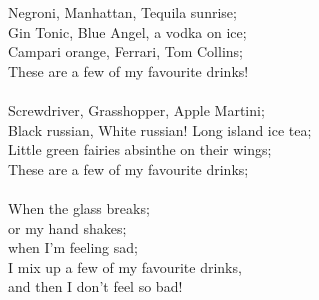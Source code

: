 
Negroni, Manhattan, Tequila sunrise; \\ Gin Tonic, Blue Angel, a vodka on ice; \\ Campari orange, Ferrari, Tom Collins; \\ These are a few of my favourite drinks! \\ \hspace{10mm} \\ Screwdriver, Grasshopper, Apple Martini; \\ Black russian, White russian! Long island ice tea; \\ Little green fairies absinthe on their wings; \\ These are a few of my favourite drinks; \\ \hspace{10mm} \\ When the glass breaks; \\ or my hand shakes; \\ when I'm feeling sad; \\ I mix up a few of my favourite drinks, \\ and then I don't feel so bad!
